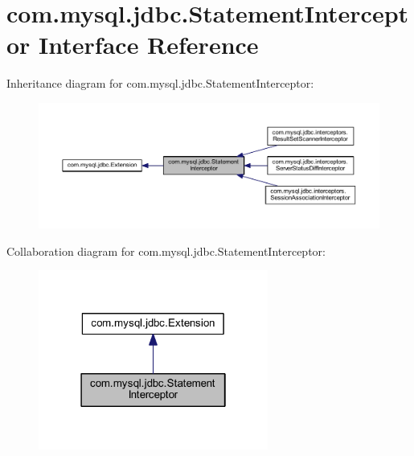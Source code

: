 \hypertarget{interfacecom_1_1mysql_1_1jdbc_1_1_statement_interceptor}{}\section{com.\+mysql.\+jdbc.\+Statement\+Interceptor Interface Reference}
\label{interfacecom_1_1mysql_1_1jdbc_1_1_statement_interceptor}


Inheritance diagram for com.\+mysql.\+jdbc.\+Statement\+Interceptor\+:
\nopagebreak
\begin{figure}[H]
\begin{center}
\leavevmode
\includegraphics[width=350pt]{interfacecom_1_1mysql_1_1jdbc_1_1_statement_interceptor__inherit__graph}
\end{center}
\end{figure}


Collaboration diagram for com.\+mysql.\+jdbc.\+Statement\+Interceptor\+:
\nopagebreak
\begin{figure}[H]
\begin{center}
\leavevmode
\includegraphics[width=214pt]{interfacecom_1_1mysql_1_1jdbc_1_1_statement_interceptor__coll__graph}
\end{center}
\end{figure}
